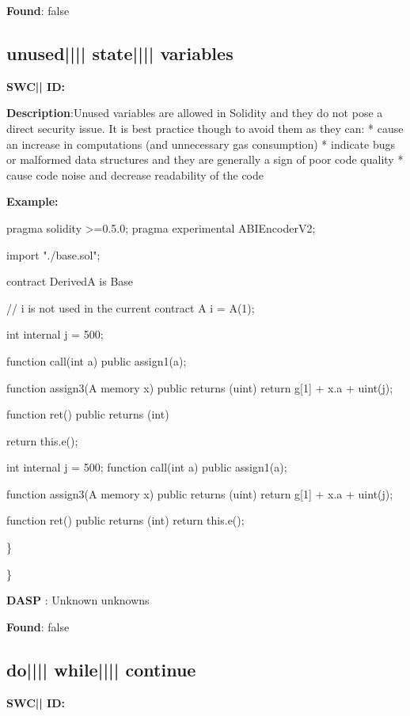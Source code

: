 \documentclass{article}
\begin{document}
\textbf{Found}: false

\subsection{unused{||\textunderscore|| }state{||\textunderscore|| }variables} 
\textbf{SWC{|\textunderscore| }ID:} 

\textbf{Description}:Unused variables are allowed in Solidity and they do not pose a direct security issue. It is best practice though to avoid them as they can:
* cause an increase in computations (and unnecessary gas consumption)
* indicate bugs or malformed data structures and they are generally a sign of poor code quality
* cause code noise and decrease readability of the code


\textbf{Example:} 
\begin{ffcode} 

pragma solidity >=0.5.0;
pragma experimental ABIEncoderV2;

import "./base.sol";

contract DerivedA is Base {
    // i is not used in the current contract
    A i = A(1);

    int internal j = 500;

    function call(int a) public {
        assign1(a);
    }

    function assign3(A memory x) public returns (uint) {
        return g[1] + x.a + uint(j);
    }

    function ret() public returns (int){
        return this.e();

    }
  int internal j = 500;
function call(int a) public {
        assign1(a);
    }

    function assign3(A memory x) public returns (uint) {
        return g[1] + x.a + uint(j);
    }

    function ret() public returns (int){
        return this.e();
  }
}

\end{ffcode} 
\} 

\} 

\textbf{DASP} : Unknown unknowns

\textbf{Found}: false

\subsection{do{||\textunderscore|| }while{||\textunderscore|| }continue} 
\textbf{SWC{|\textunderscore| }ID:} 
\end{document}
